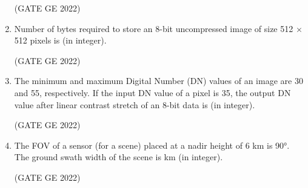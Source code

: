 \documentclass[journal,12pt,onecolumn]{IEEEtran}
\theoremstyle{remark}
\begin{document}
\begin{enumerate}
\hfill (GATE GE 2022)

\item Number of bytes required to store an 8-bit uncompressed image of size 512 $\times$ 512 pixels is \makebox[1cm]{\hrulefill} (in integer).

\hfill (GATE GE 2022)

\item The minimum and maximum Digital Number (DN) values of an image are 30 and 55, respectively. If the input DN value of a pixel is 35, the output DN value after linear contrast stretch of an 8-bit data is \makebox[1cm]{\hrulefill} (in integer).

\hfill (GATE GE 2022)

\item The FOV of a sensor (for a scene) placed at a nadir height of 6 km is 90°. The ground swath width of the scene is \makebox[1cm]{\hrulefill} km (in integer).

\hfill (GATE GE 2022)

\end{enumerate}
\end{document}
